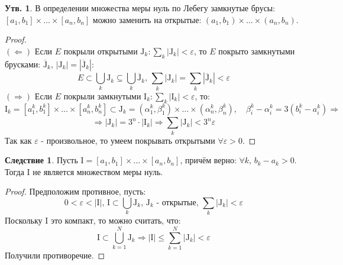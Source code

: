 \documentclass[12pt]{article}
\newcommand{\MI}{\mathrm{I}}
\newcommand{\MJ}{\mathrm{J}}
\newcommand{\VE}{\varepsilon}
\theoremstyle{definition}
\newtheorem{prop}{Утв.}
\newtheorem{corollary}{Следствие}
\newcommand{\ddsum}[2]{\displaystyle\sum\limits_{#1}^{#2}}
\newcommand{\ovl}[1]{\overline{#1}}
\begin{document}
\begin{prop}
	В определении множества меры нуль по Лебегу замкнутые брусы: $[a_1,b_1]\times \dotsc \times [a_n,b_n]$ можно заменить на открытые: $(a_1,b_1)\times \dotsc \times (a_n,b_n)$.
\end{prop}
\begin{proof}\hfill\\
	$(\Leftarrow)$ Если $E$ покрыли открытыми $\MJ_k \colon \sum_k |\MJ_k| < \VE$, то $E$ покрыто замкнутыми брусками: $\ovl{\MJ}_k,\, |\MJ_k| = |\ovl{\MJ}_k|$:
	$$
		E \subset \bigcup\limits_k \MJ_k \subseteq \bigcup\limits_k \ovl{\MJ}_k, \, \ddsum{k}{}|\MJ_k| = \ddsum{k}{}|\ovl{\MJ}_k| < \VE
	$$
	$(\Rightarrow)$ Если $E$ покрыли замкнутыми $\MI_k \colon \sum_k |\MI_k| < \VE$, то:
	$$
		\MI_k = [a_1^k, b_1^k] \times \dotsc \times [a_n^k, b_n^k] \subset \MJ_k = (\alpha_1^k,\beta_1^k) \times \dotsc \times (\alpha_n^k,\beta_n^k), \quad \beta_i^k - \alpha_i^k = 3 (b_i^k - a_i^k) \Rightarrow
	$$
	$$
		\Rightarrow |\MJ_k| = 3^n{\cdot}|\MI_k| \Rightarrow \ddsum{k}{}|\MJ_k| < 3^n\VE
	$$
	Так как $\VE$ - произвольное, то умеем покрывать открытыми $\forall \VE > 0$.
\end{proof}

\begin{corollary}
	Пусть $\MI = [a_1,b_1]\times \dotsc \times[a_n,b_n]$, причём верно: $\forall k, \, b_k - a_k > 0$. Тогда $\MI$ не является множеством меры нуль.
\end{corollary}
\begin{proof}
	Предположим противное, пусть: 
	$$
		0 < \VE < |\MI|, \, \MI \subset \bigcup_k \MJ_k, \, \MJ_k \text{ - открытые}, \, \sum_k |\MJ_k| < \VE
	$$ 
	Поскольку $\MI$ это компакт, то можно считать, что:
	$$
		\MI \subset \bigcup\limits_{k = 1}^{N}\MJ_k \Rightarrow |\MI | \leq \ddsum{k = 1}{N}|\MJ_k| < \VE
	$$
	Получили противоречие.
\end{proof}
\end{document}
